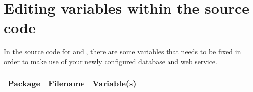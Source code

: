 \section{Editing variables within the source code}

In the source code for \app{} and \ab{}, there are some variables that needs to be fixed in order to make use of your newly configured database and web service.  

\begin{table}[H]
\begin{tabular}{|p{4.0cm} | p{4.0cm} | p{4.0cm} |}
\hline
\textbf{Package} & \textbf{Filename} & \textbf{Variable(s)} \\
\hline
\end{tabular}
\end{table}
 